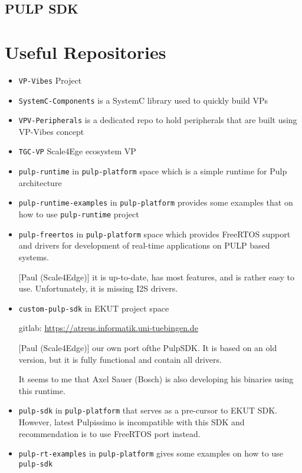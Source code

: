 \documentclass{article}
\begin{document}
\subsection{PULP SDK}

\newpage
\section{Useful Repositories}
\begin{itemize}
 \item \texttt{VP-Vibes} Project
 \item \texttt{SystemC-Components} is a SystemC library used to quickly build VPs
 \item \texttt{VPV-Peripherals} is a dedicated repo to hold peripherals that are built using VP-Vibes concept
 \item \texttt{TGC-VP} Scale4Ege ecosystem VP
 \item \texttt{pulp-runtime} in \texttt{pulp-platform} space which is a simple runtime for Pulp architecture
 \item \texttt{pulp-runtime-examples} in \texttt{pulp-platform} provides some examples that on how to use
       \texttt{pulp-runtime} project
 \item \texttt{pulp-freertos} in \texttt{pulp-platform} space which provides FreeRTOS support and drivers for
       development of real-time applications on PULP based systems.

        [Paul (Scale4Edge)] it is up-to-date, has most features, and is rather easy to use. Unfortunately, it is
       missing I2S drivers.
 \item \texttt{custom-pulp-sdk} in EKUT project space

       gitlab: \url{https://atreus.informatik.uni-tuebingen.de}

       [Paul (Scale4Edge)] our own port ofthe PulpSDK. It is based on an old version, but it is fully functional
       and contain all drivers.

       It seems to me that Axel Sauer (Bosch) is also developing his binaries using this runtime.
 \item \texttt{pulp-sdk} in \texttt{pulp-platform} that serves as a pre-cursor to EKUT SDK. However, latest
       Pulpissimo is incompatible with this SDK and recommendation is to use FreeRTOS port instead.
 \item \texttt{pulp-rt-examples} in \texttt{pulp-platform} gives some examples on how to use \texttt{pulp-sdk}
\end{itemize}
\end{document}

